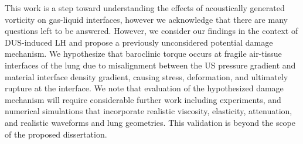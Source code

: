 This work is a step toward understanding the effects of acoustically
generated vorticity on gas-liquid interfaces, however we acknowledge
that there are many questions left to be answered. However, we
consider our findings in the context of \ac{DUS}-induced \ac{LH} and
propose a previously unconsidered potential damage mechanism. We
hypothesize that baroclinic torque occurs at fragile air-tissue
interfaces of the lung due to misalignment between the \ac{US}
pressure gradient and material interface density gradient, causing
stress, deformation, and ultimately rupture at the interface. We note
that evaluation of the hypothesized damage mechanism will require
considerable further work including experiments, and numerical
simulations that incorporate realistic viscosity, elasticity,
attenuation, and realistic waveforms and lung geometries. This
validation is beyond the scope of the proposed dissertation.

